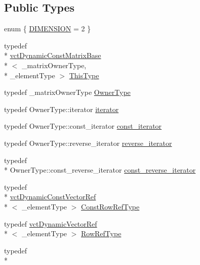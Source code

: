 \subsection*{Public Types}
\begin{DoxyCompactItemize}
\item 
enum \{ \hyperlink{classvct_dynamic_const_matrix_base_ad4b10a99ce01d58a9d7049bf0f28ee95a7101e5e87be1df37bf896f120fa37d10}{D\-I\-M\-E\-N\-S\-I\-O\-N} = 2
 \}
\item 
typedef \\*
\hyperlink{classvct_dynamic_const_matrix_base}{vct\-Dynamic\-Const\-Matrix\-Base}\\*
$<$ \-\_\-matrix\-Owner\-Type, \\*
\-\_\-element\-Type $>$ \hyperlink{classvct_dynamic_const_matrix_base_ac4ff48cbe4d9de3fdef5a02447ffb9db}{This\-Type}
\item 
typedef \-\_\-matrix\-Owner\-Type \hyperlink{classvct_dynamic_const_matrix_base_a2e37ebc2ac741d4346d21f986e625e96}{Owner\-Type}
\item 
typedef Owner\-Type\-::iterator \hyperlink{classvct_dynamic_const_matrix_base_aee4b4524b7972fd1b324cba62505a949}{iterator}
\item 
typedef Owner\-Type\-::const\-\_\-iterator \hyperlink{classvct_dynamic_const_matrix_base_a665b16a8ecd8b6febb4d193efa42205e}{const\-\_\-iterator}
\item 
typedef Owner\-Type\-::reverse\-\_\-iterator \hyperlink{classvct_dynamic_const_matrix_base_a53905f35527b9ce433c246ab50a6b812}{reverse\-\_\-iterator}
\item 
typedef \\*
Owner\-Type\-::const\-\_\-reverse\-\_\-iterator \hyperlink{classvct_dynamic_const_matrix_base_afc30420e745eed5f1c838a01088ddc84}{const\-\_\-reverse\-\_\-iterator}
\item 
typedef \\*
\hyperlink{classvct_dynamic_const_vector_ref}{vct\-Dynamic\-Const\-Vector\-Ref}\\*
$<$ \-\_\-element\-Type $>$ \hyperlink{classvct_dynamic_const_matrix_base_a42a300cb1afd5f0602ba5c2d7d9cc40b}{Const\-Row\-Ref\-Type}
\item 
typedef \hyperlink{classvct_dynamic_vector_ref}{vct\-Dynamic\-Vector\-Ref}\\*
$<$ \-\_\-element\-Type $>$ \hyperlink{classvct_dynamic_const_matrix_base_a15b845e745a76559d730ecef10a991b7}{Row\-Ref\-Type}
\item 
typedef \\*

\end{DoxyCompactItemize}
